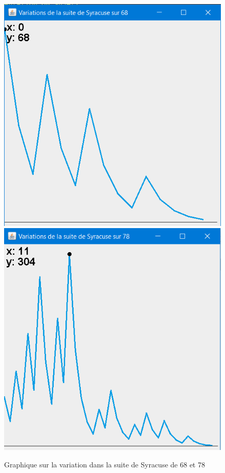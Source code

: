 \begin{figure}[H]
\includegraphics[scale=0.59]{images/syracuse_var_68.PNG}
\includegraphics[scale=0.6]{images/syracuse_var_78.PNG}
\centering
\caption{Graphique sur la variation dans la suite de Syracuse de 68 et 78}
\label{syra78}
\end{figure}

